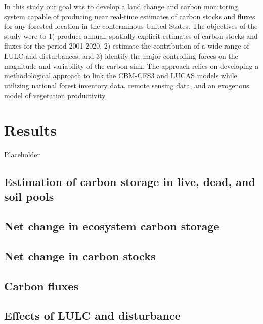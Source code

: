 \documentclass[
]{book}
\begin{document}
In this study our goal was to develop a land change and carbon monitoring system capable of producing near real-time estimates of carbon stocks and fluxes for any forested location in the conterminous United States. The objectives of the study were to 1) produce annual, spatially-explicit estimates of carbon stocks and fluxes for the period 2001-2020, 2) estimate the contribution of a wide range of LULC and disturbances, and 3) identify the major controlling forces on the magnitude and variability of the carbon sink. The approach relies on developing a methodological approach to link the CBM-CFS3 and LUCAS models while utilizing national forest inventory data, remote sensing data, and an exogenous model of vegetation productivity.

\hypertarget{results}{%
\chapter{Results}\label{results}}

Placeholder

\hypertarget{estimation-of-carbon-storage-in-live-dead-and-soil-pools}{%
\section{Estimation of carbon storage in live, dead, and soil pools}\label{estimation-of-carbon-storage-in-live-dead-and-soil-pools}}

\hypertarget{net-change-in-ecosystem-carbon-storage}{%
\section{Net change in ecosystem carbon storage}\label{net-change-in-ecosystem-carbon-storage}}

\hypertarget{net-change-in-carbon-stocks}{%
\section{Net change in carbon stocks}\label{net-change-in-carbon-stocks}}

\hypertarget{carbon-fluxes}{%
\section{Carbon fluxes}\label{carbon-fluxes}}

\hypertarget{effects-of-lulc-and-disturbance}{%
\section{Effects of LULC and disturbance}\label{effects-of-lulc-and-disturbance}}
\end{document}
